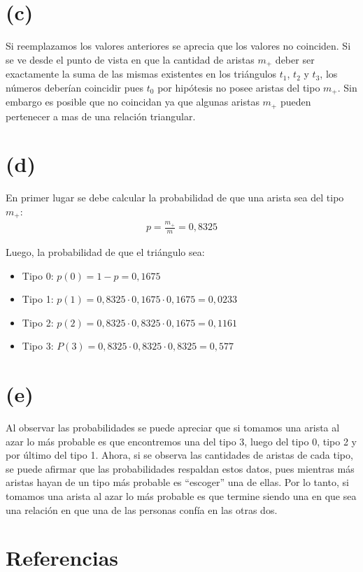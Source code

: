 \documentclass[letterpaper]{article}
\begin{document}
\section{(c)}
Si reemplazamos los valores anteriores se aprecia que los valores no coinciden. Si se ve desde el punto de vista en que la cantidad de aristas $m_{+}$ deber ser exactamente la suma de las mismas existentes en los triángulos $t_1$, $t_2$ y $t_3$, los números deberían coincidir pues $t_0$ por hipótesis no posee aristas del tipo $m_{+}$. Sin embargo es posible que no coincidan ya que algunas aristas $m_{+}$ pueden pertenecer a mas de una relación triangular.

\section{(d)}
En primer lugar se debe calcular la probabilidad de que una arista sea del tipo $m_+$:
\begin{align}
  p = \frac{m_+}{m} = 0,8325
\end{align}

Luego, la probabilidad de que el triángulo sea:

\begin{itemize}
  \item Tipo 0: $p(0) = 1-p =0,1675$
  \item Tipo 1: $p(1) = 0,8325 \cdot 0,1675 \cdot 0,1675 = 0,0233$
  \item Tipo 2: $p(2) = 0,8325 \cdot 0,8325 \cdot 0,1675 = 0,1161$
  \item Tipo 3: $P(3) = 0,8325 \cdot 0,8325 \cdot 0,8325 = 0,577$
\end{itemize}

\section{(e)}
Al observar las probabilidades se puede apreciar que si tomamos una arista al azar lo más probable es que encontremos una del tipo 3, luego del tipo 0, tipo 2 y por último del tipo 1. Ahora, si se observa las cantidades de aristas de cada tipo, se puede afirmar que las probabilidades respaldan estos datos, pues mientras más aristas hayan de un tipo más probable es “escoger” una de ellas. Por lo tanto, si tomamos una arista al azar lo más probable es que termine siendo una en que sea una relación en que una de las personas confía en las otras dos.



\section{Referencias}
\end{document}
